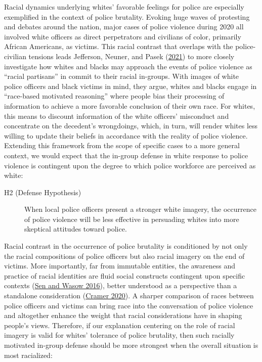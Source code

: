 \documentclass[
  12pt,
]{article}
\begin{document}
Racial dynamics underlying whites' favorable feelings for police are
especially exemplified in the context of police brutality. Evoking huge
waves of protesting and debates around the nation, major cases of police
violence during 2020 all involved white officers as direct perpetrators
and civilians of color, primarily African Americans, as victims. This
racial contrast that overlaps with the police-civilian tensions leads
Jefferson, Neuner, and Pasek
(\protect\hyperlink{ref-jefferson2021}{2021}) to more closely
investigate how whites and blacks may approach the events of police
violence as ``racial partisans'' in commit to their racial in-groups.
With images of white police officers and black victims in mind, they
argue, whites and blacks engage in ``race-based motivated reasoning''
where people bias their processing of information to achieve a more
favorable conclusion of their own race. For whites, this means to
discount information of the white officers' misconduct and concentrate
on the decedent's wrongdoings, which, in turn, will render whites less
willing to update their beliefs in accordance with the reality of police
violence. Extending this framework from the scope of specific cases to a
more general context, we would expect that the in-group defense in white
response to police violence is contingent upon the degree to which
police workforce are perceived as white:

\begin{description}
\item[H2 (Defense Hypothesis)]
When local police officers present a stronger white imagery, the
occurrence of police violence will be less effective in persuading
whites into more skeptical attitudes toward police.
\end{description}

Racial contrast in the occurrence of police brutality is conditioned by
not only the racial compositions of police officers but also racial
imagery on the end of victims. More importantly, far from immutable
entities, the awareness and practice of racial identities are fluid
social constructs contingent upon specific contexts
(\protect\hyperlink{ref-sen2016}{Sen and Wasow 2016}), better understood
as a perspective than a standalone consideration
(\protect\hyperlink{ref-cramer2020}{Cramer 2020}). A sharper comparison
of races between police officers and victims can bring race into the
conversation of police violence and altogether enhance the weight that
racial considerations have in shaping people's views. Therefore, if our
explanation centering on the role of racial imagery is valid for whites'
tolerance of police brutality, then such racially motivated in-group
defense should be more strongest when the overall situation is most
racialized:
\end{document}
